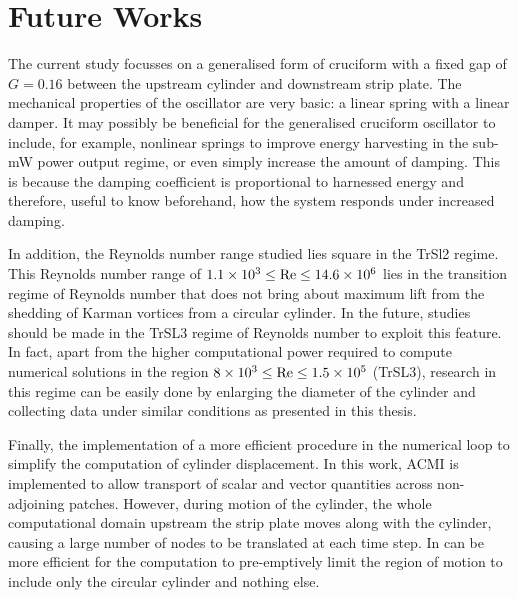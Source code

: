 \documentclass[oneside]{utmthesis}
\begin{document}
\section{Future Works} \label{sec:concFutureWorks}
The current study focusses on a generalised form of cruciform with a fixed gap of $G = 0.16$ between the upstream cylinder and downstream strip plate. The mechanical properties of the oscillator are very basic: a linear spring with a linear damper. It may possibly be beneficial for the generalised cruciform oscillator to include, for example, nonlinear springs to improve energy harvesting in the sub-mW power output regime, or even simply increase the amount of damping. This is because the damping coefficient is proportional to harnessed energy and therefore, useful to know beforehand, how the system responds under increased damping.

In addition, the Reynolds number range studied lies square in the TrSl2 regime. This Reynolds number range of $1.1 \times 10^{3} \leq \text{Re} \leq 14.6 \times 10^{6}$ lies in the transition regime of Reynolds number that does not bring about maximum lift from the shedding of Karman vortices from a circular cylinder. In the future, studies should be made in the TrSL3 regime of Reynolds number to exploit this feature. In fact, apart from the higher computational power required to compute numerical solutions in the region $8 \times 10^{3} \leq \text{Re} \leq 1.5 \times 10^{5}$ (TrSL3), research in this regime can be easily done by enlarging the diameter of the cylinder and collecting data under similar conditions as presented in this thesis.

Finally, the implementation of a more efficient procedure in the numerical loop to simplify the computation of cylinder displacement. In this work, ACMI is implemented to allow transport of scalar and vector quantities across non-adjoining patches. However, during motion of the cylinder, the whole computational domain upstream the strip plate moves along with the cylinder, causing a large number of nodes to be translated at each time step. In can be more efficient for the computation to pre-emptively limit the region of motion to include only the circular cylinder and nothing else.


%

\end{document}
